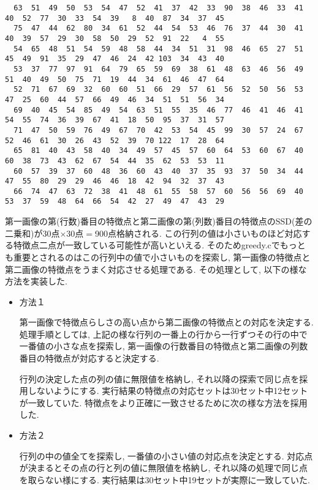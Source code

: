 \documentclass[a4j]{jarticle}
\begin{document}
{\begin{verbatim}
  63  51  49  50  53  54  47  52  41  37  42  33  90  38  46  33  41  40  52  77  30  33  54  39   8  40  87  34  37  45
  75  47  44  62  80  34  61  52  44  54  53  46  76  37  44  30  41  40  39  57  29  30  58  50  29  52  91  22   4  55
  54  65  48  51  54  59  48  58  44  34  51  31  98  46  65  27  51  45  49  91  35  29  47  46  24  42 103  34  43  40
  53  37  77  97  91  64  79  65  59  69  38  61  48  63  46  56  49  51  40  49  50  75  71  19  44  34  61  46  47  64
  52  71  67  69  32  60  60  51  66  29  57  61  56  52  50  56  53  47  25  60  44  57  66  49  46  34  51  51  56  34
  69  40  45  54  85  49  54  63  51  55  35  46  77  46  41  46  41  54  55  74  36  39  67  41  18  50  95  37  31  57
  71  47  50  59  76  49  67  70  42  53  54  45  99  30  57  24  67  52  46  61  30  26  43  52  39  70 122  17  28  64
  65  81  40  43  58  40  34  49  57  45  57  60  64  53  60  67  40  60  38  73  43  62  67  54  44  35  62  53  53  11
  60  57  39  37  60  48  36  60  43  40  37  35  93  37  50  34  44  47  55  80  29  29  46  46  18  42  94  32  37  43
  66  74  47  63  72  38  41  48  61  55  58  57  60  56  56  69  40  53  37  59  48  64  66  54  42  27  49  47  43  29

\end{verbatim}
}
第一画像の第(行数)番目の特徴点と第二画像の第(列数)番目の特徴点のSSD(差の二乗和)が30点$×$30点$=$900点格納される. 
この行列の値は小さいものほど対応する特徴点二点が一致している可能性が高いといえる. 
そのためgreedy.cでもっとも重要とされるのはこの行列中の値で小さいものを探索し, 第一画像の特徴点と第二画像の特徴点をうまく対応させる処理である. 
その処理として, 以下の様な方法を実装した.

\begin{itemize}
\item{方法１}

第一画像で特徴点らしさの高い点から第二画像の特徴点との対応を決定する. 
処理手順としては, 上記の様な行列の一番上の行から一行ずつその行の中で一番値の小さな点を探索し, 第一画像の行数番目の特徴点と第二画像の列数番目の特徴点が対応すると決定する. 

行列の決定した点の列の値に無限値を格納し, それ以降の探索で同じ点を採用しないようにする. 
実行結果の特徴点の対応セットは30セット中12セットが一致していた.
特徴点をより正確に一致させるために次の様な方法を採用した.

\item{方法２}

行列の中の値全てを探索し, 一番値の小さい値の対応点を決定とする.
対応点が決まるとその点の行と列の値に無限値を格納し, それ以降の処理で同じ点を取らない様にする. 
実行結果は30セット中19セットが実際に一致していた. 
\end{itemize}
\end{document}
